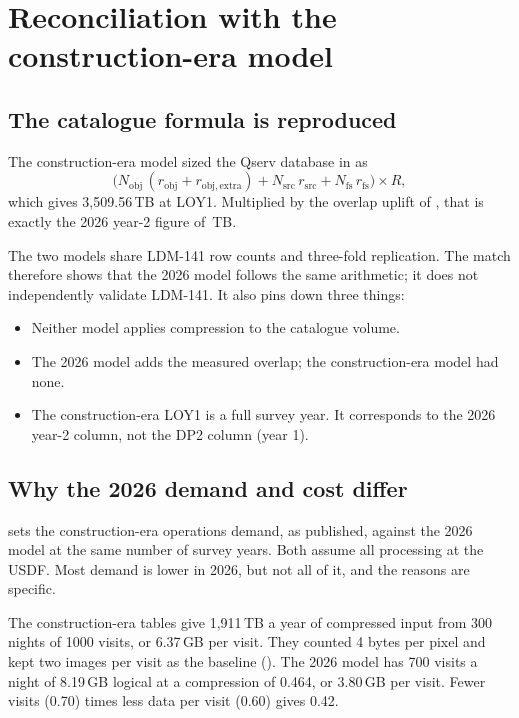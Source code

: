 \section{Reconciliation with the construction-era model}\label{sec:upreconcile}

\subsection{The catalogue formula is reproduced}

The construction-era model sized the Qserv database in
 as
\[
  \bigl(N_{\mathrm{obj}}\,(r_{\mathrm{obj}} + r_{\mathrm{obj,extra}})
        + N_{\mathrm{src}}\,r_{\mathrm{src}}
        + N_{\mathrm{fs}}\,r_{\mathrm{fs}}\bigr) \times R ,
\]
which gives 3{,}509.56\,TB at LOY1. Multiplied by the overlap uplift of
\smQsOverlap{}, that is exactly the 2026 year-2 figure of \smQsDRoneDiskTB{}\,TB.

The two models share LDM-141 row counts and three-fold replication. The match
therefore shows that the 2026 model follows the same arithmetic; it does not
independently validate LDM-141. It also pins down three things:
\begin{itemize}
\item Neither model applies compression to the catalogue volume.
\item The 2026 model adds the measured overlap; the construction-era model
      had none.
\item The construction-era LOY1 is a full survey year. It corresponds to the
      2026 year-2 column, not the DP2 column (year 1).
\end{itemize}

\subsection{Why the 2026 demand and cost differ}\label{sec:upwhy}

 sets the construction-era operations demand, as
published, against the 2026 model at the same number of survey years. Both
assume all processing at the USDF. Most demand is lower in 2026, but not all
of it, and the reasons are specific.

The construction-era tables give 1{,}911\,TB a year of compressed input from
300 nights of 1000 visits, or 6.37\,GB per visit. They counted 4 bytes per pixel
and kept two images per visit as the baseline (). The
2026 model has 700 visits a night of 8.19\,GB logical at a compression of
0.464, or 3.80\,GB per visit. Fewer visits (0.70) times less data per visit
(0.60) gives 0.42.


